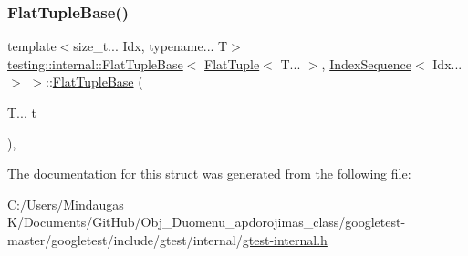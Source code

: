 \mbox{\label{structtesting_1_1internal_1_1_flat_tuple_base_3_01_flat_tuple_3_01_t_8_8_8_01_4_00_01_index_sequence_3_01_idx_8_8_8_01_4_01_4_ac515eec5c0647748bf8fa4ff553c706e}} 
\subsubsection{\texorpdfstring{FlatTupleBase()}{FlatTupleBase()}\hspace{0.1cm}{\footnotesize\ttfamily [4/4]}}
{\footnotesize\ttfamily template$<$size\+\_\+t... Idx, typename... T$>$ \\
\mbox{\hyperlink{structtesting_1_1internal_1_1_flat_tuple_base}{testing\+::internal\+::\+Flat\+Tuple\+Base}}$<$ \mbox{\hyperlink{classtesting_1_1internal_1_1_flat_tuple}{Flat\+Tuple}}$<$ T... $>$, \mbox{\hyperlink{structtesting_1_1internal_1_1_index_sequence}{Index\+Sequence}}$<$ Idx... $>$ $>$\+::\mbox{\hyperlink{structtesting_1_1internal_1_1_flat_tuple_base}{Flat\+Tuple\+Base}} (\begin{DoxyParamCaption}\item[{T...}]{t }\end{DoxyParamCaption})\hspace{0.3cm}{\ttfamily [inline]}, {\ttfamily [explicit]}}



The documentation for this struct was generated from the following file\+:\begin{DoxyCompactItemize}
\item 
C\+:/\+Users/\+Mindaugas K/\+Documents/\+Git\+Hub/\+Obj\+\_\+\+Duomenu\+\_\+apdorojimas\+\_\+class/googletest-\/master/googletest/include/gtest/internal/\mbox{\hyperlink{googletest-master_2googletest_2include_2gtest_2internal_2gtest-internal_8h}{gtest-\/internal.\+h}}\end{DoxyCompactItemize}
